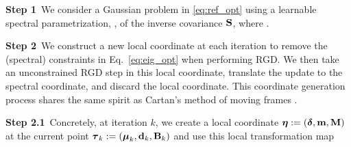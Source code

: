 \vspace{-0.05cm}
{\bf Step 1}\, We consider a Gaussian problem in \eqref{eq:ref_opt} using 
a learnable spectral parametrization, , of the inverse covariance $\mbox{$\mbox{$\mathbf{S}$}$}$, where .
 
\vspace{-0.4cm}

{\bf Step 2}\, We construct a new local coordinate at each iteration to remove the (spectral) constraints in Eq.~\eqref{eq:eig_opt}  when performing RGD.
We then take an unconstrained RGD step in this local coordinate, translate the update to the spectral coordinate, and discard the local coordinate. This coordinate generation process shares the same spirit as Cartan's method of moving frames \citep{ivey2003cartan}.


{\bf Step 2.1}\, Concretely, at iteration $k$, we create a local coordinate $\mbox{$\mbox{$\boldsymbol{\eta}$}$}:=(\mbox{$\mbox{$\boldsymbol{\delta}$}$},\mbox{$\mbox{$\mathbf{m}$}$},\mbox{$\mbox{$\mathbf{M}$}$})$ at the current point $\mbox{$\mbox{$\boldsymbol{\tau}$}$}_k:=(\mbox{$\mbox{$\boldsymbol{\mu}$}$}_k,\mbox{$\mbox{$\mathbf{d}$}$}_k, \mbox{$\mbox{$\mathbf{B}$}$}_k)$ and use this local transformation map

 \vspace{-0.3cm}

